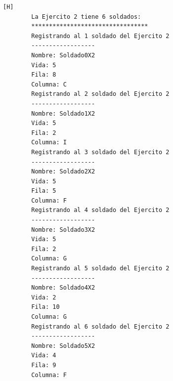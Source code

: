 \documentclass{article}
\begin{document}
	\begin{lstlisting}[language=bash,caption={Ejecucion:}][H]
		La Ejercito 2 tiene 6 soldados:
		*********************************
		Registrando al 1 soldado del Ejercito 2
		------------------
		Nombre: Soldado0X2
		Vida: 5
		Fila: 8
		Columna: C
		Registrando al 2 soldado del Ejercito 2
		------------------
		Nombre: Soldado1X2
		Vida: 5
		Fila: 2
		Columna: I
		Registrando al 3 soldado del Ejercito 2
		------------------
		Nombre: Soldado2X2
		Vida: 5
		Fila: 5
		Columna: F
		Registrando al 4 soldado del Ejercito 2
		------------------
		Nombre: Soldado3X2
		Vida: 5
		Fila: 2
		Columna: G
		Registrando al 5 soldado del Ejercito 2
		------------------
		Nombre: Soldado4X2
		Vida: 2
		Fila: 10
		Columna: G
		Registrando al 6 soldado del Ejercito 2
		------------------
		Nombre: Soldado5X2
		Vida: 4
		Fila: 9
		Columna: F
	\end{lstlisting}
\end{document}
